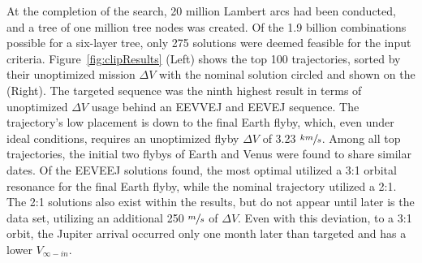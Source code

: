 \documentclass[letterpaper, paper,11pt]{AAS}	%
\begin{document}
At the completion of the search, 20 million Lambert arcs had been conducted, and a tree of one million tree nodes was created. Of the 1.9 billion combinations possible for a six-layer tree, only 275 solutions were deemed feasible for the input criteria. Figure~\ref*{fig:clipResults} (Left) shows the top 100 trajectories, sorted by their unoptimized mission $\Delta V$ with the nominal solution circled and shown on the (Right). The targeted sequence was the ninth highest result in terms of unoptimized $\Delta V$ usage behind an EEVVEJ and EEVEJ sequence. The trajectory's low placement is down to the final Earth flyby, which, even under ideal conditions, requires an unoptimized flyby $\Delta V$ of 3.23 $\sfrac{km}{s}$. Among all top trajectories, the initial two flybys of Earth and Venus were found to share similar dates. Of the EEVEEJ solutions found, the most optimal utilized a 3:1 orbital resonance for the final Earth flyby, while the nominal trajectory utilized a 2:1. The 2:1 solutions also exist within the results, but do not appear until later is the data set, utilizing an additional 250 $\sfrac{m}{s}$ of $\Delta V$. Even with this deviation, to a 3:1 orbit, the Jupiter arrival occurred only one month later than targeted and has a lower $V_{\infty-in}$.
\end{document}
